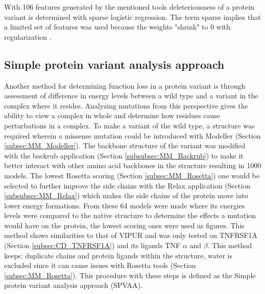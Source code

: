 With 106 features generated by the mentioned tools deleteriousness of a protein variant is determined with sparse logistic regression. The term sparse implies that a limited set of features was used because the weights "shrink" to 0 with regularization \cite{}.
\label{subsec:MM_VIPUR}

\subsection{Simple protein variant analysis approach}
Another method for determining function loss in a protein variant is through assessment of difference in energy levels between a wild type and a variant in the complex where it resides. Analyzing mutations from this perspective gives the ability to view a complex in whole and determine how residues cause perturbations in a complex. To make a variant of the wild type, a structure was required wherein a missense mutation could be introduced with Modeller (Section \ref{subsec:MM_Modeller}). The backbone structure of the variant was modified with the backrub application (Section \ref{subsubsec:MM_Backrub}) to make it better interact with other amino acid backbones in the structure resulting in 1000 models. The lowest Rosetta scoring (Section \ref{subsec:MM_Rosetta}) one would be selected to further improve the side chains with the Relax application
 (Section \ref{subsubsec:MM_Relax}) which makes the side chains of the protein move into lower energy formations. From these 64 models were made where its energies levels were compared to the native structure to determine the effects a mutation would have on the protein, the lowest scoring ones were used as figures. This method shows similarities to that of VIPUR and was only tested on TNFRSF1A (Section \ref{subsec:CD_TNFRSF1A}) and its ligands TNF $\alpha$ and $\beta$. This method keeps: duplicate chains and protein ligands within the structure, water is excluded since it can cause issues with Rosetta tools (Section \ref{subsec:MM_Rosetta}). This procedure with these steps is defined as the Simple protein variant analysis approach (SPVAA).
\label{subsec:MM_SPVAA}

